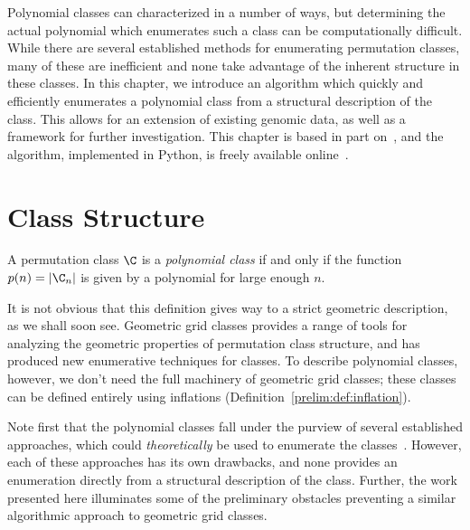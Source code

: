 \documentclass[12pt,twoside]{memoir}
\begin{document}
    Polynomial classes can characterized in a number of ways, but determining the
    actual polynomial which enumerates such a class can be computationally
    difficult. While there are several established methods for enumerating
    permutation classes, many of these are inefficient and none take advantage of
    the inherent structure in these classes.  In this chapter, we introduce an
    algorithm which quickly and efficiently enumerates a polynomial class from a
    structural description of the class.  This allows for an extension of
    existing genomic data, as well as a framework for further investigation. This
    chapter is based in part on~\cite{me-polyclass}, and the algorithm,
    implemented in Python, is freely available online~\cite{polyclass-algo}. 
    


  \section{Class Structure}
  \label{polyclass:sec:gridclasses}

    \begin{definition} \label{polyclass:def:polyclass}
      A permutation class $\C$ is a \emph{polynomial class} if and only if the
      function $p(n) = |\C_n|$ is given by a polynomial for large enough $n$. 
    \end{definition} 

    It is not obvious that this definition gives way to a strict geometric
    description, as we shall soon see. Geometric grid classes provides a range of
    tools for analyzing the geometric properties of permutation class structure,
    and has produced new enumerative techniques for classes. To describe
    polynomial classes, however, we don't need the full machinery of geometric
    grid classes; these classes can be defined entirely using inflations
    (Definition~\ref{prelim:def:inflation}). 

    Note first that the polynomial classes fall under the purview of several
    established approaches, which could \emph{theoretically} be used to enumerate
    the classes~\cite{GridClasses, RegInsEnc, Atkinson2005, Linton2005,
    Brignall2008}. However, each of these approaches has its own drawbacks, and
    none provides an enumeration directly from a structural description of the
    class. Further, the work presented here illuminates some of the preliminary
    obstacles preventing a similar algorithmic approach to geometric grid
    classes. 
    
\end{document}

